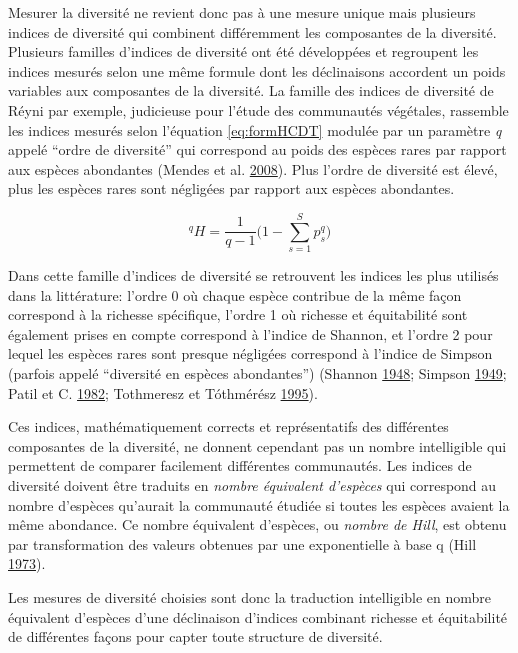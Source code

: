 \documentclass[11pt,french,A4paper,extrafontsizes,onecolumn,openright]{memoir}
\begin{document}
Mesurer la diversité ne revient donc pas à une mesure unique mais
plusieurs indices de diversité qui combinent différemment les
composantes de la diversité. Plusieurs familles d'indices de diversité
ont été développées et regroupent les indices mesurés selon une même
formule dont les déclinaisons accordent un poids variables aux
composantes de la diversité. La famille des indices de diversité de
Réyni par exemple, judicieuse pour l'étude des communautés végétales,
rassemble les indices mesurés selon l'équation \eqref{eq:formHCDT} modulée
par un paramètre \emph{q} appelé ``ordre de diversité'' qui correspond
au poids des espèces rares par rapport aux espèces abondantes (Mendes et
al. \protect\hyperlink{ref-Mendes2008}{2008}). Plus l'ordre de diversité
est élevé, plus les espèces rares sont négligées par rapport aux espèces
abondantes.

\begin{equation}
{^{q}H=\frac{1}{q-1}\Bigg(1-\displaystyle\sum_{s=1}^{S}p^q_s\Bigg) }
\label{eq:formHCDT}
\end{equation}

Dans cette famille d'indices de diversité se retrouvent les indices les
plus utilisés dans la littérature: l'ordre 0 où chaque espèce contribue
de la même façon correspond à la richesse spécifique, l'ordre 1 où
richesse et équitabilité sont également prises en compte correspond à
l'indice de Shannon, et l'ordre 2 pour lequel les espèces rares sont
presque négligées correspond à l'indice de Simpson (parfois appelé
``diversité en espèces abondantes'') (Shannon
\protect\hyperlink{ref-Shannon1948}{1948}; Simpson
\protect\hyperlink{ref-Simpson1949}{1949}; Patil et C.
\protect\hyperlink{ref-Patil1982}{1982}; Tothmeresz et Tóthmérész
\protect\hyperlink{ref-Tothmeresz1995}{1995}).

Ces indices, mathématiquement corrects et représentatifs des différentes
composantes de la diversité, ne donnent cependant pas un nombre
intelligible qui permettent de comparer facilement différentes
communautés. Les indices de diversité doivent être traduits en
\emph{nombre équivalent d'espèces} qui correspond au nombre d'espèces
qu'aurait la communauté étudiée si toutes les espèces avaient la même
abondance. Ce nombre équivalent d'espèces, ou \emph{nombre de Hill}, est
obtenu par transformation des valeurs obtenues par une exponentielle à
base q (Hill \protect\hyperlink{ref-Hill1973}{1973}).

Les mesures de diversité choisies sont donc la traduction intelligible
en nombre équivalent d'espèces d'une déclinaison d'indices combinant
richesse et équitabilité de différentes façons pour capter toute
structure de diversité.
\end{document}
